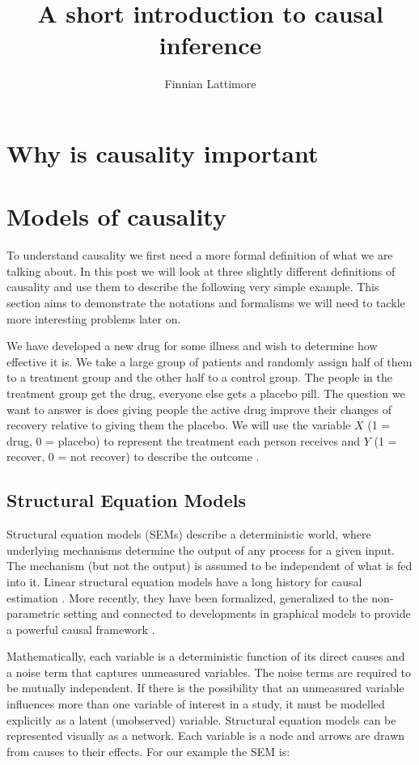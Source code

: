 \documentclass[11pt,a4paper]{article}
\author{Finnian Lattimore}
\title{A short introduction to causal inference}
\begin{document}
\def\ci{\perp\!\!\!\perp} %

\section{Why is causality important}

\section{Models of causality}
To understand causality we first need a more formal definition of what we are talking about. In this post we will look at three slightly different definitions of causality and use them to describe the following very simple example. This section aims to demonstrate the notations and formalisms we will need to tackle more interesting problems later on.

We have developed a new drug for some illness and wish to determine how effective it is. We take a large group of patients and randomly assign half of them to a treatment group and the other half to a control group. The people in the treatment group get the drug, everyone else gets a placebo pill. The question we want to answer is does giving people the active drug improve their changes of recovery relative to giving them the placebo. We will use the variable $X$ (1 = drug, 0 = placebo) to represent the treatment each person receives and $Y$ (1 = recover, 0 = not recover) to describe the outcome .
\subsection{Structural Equation Models}

Structural equation models (SEMs) describe a deterministic world, where underlying mechanisms determine the output of any process for a given input. The mechanism (but not the output) is assumed to be independent of what is fed into it. Linear structural equation models have a long history for causal estimation \cite {Wright1921,Haavelmo1943}. More recently, they have been formalized, generalized to the non-parametric setting and connected to developments in graphical models to provide a powerful causal framework \cite{Pearl2000}.

Mathematically, each variable is a deterministic function of its direct causes and a noise term that captures unmeasured variables. The noise terms are required to be mutually independent. If there is the possibility that an unmeasured variable influences more than one variable of interest in a study, it must be modelled explicitly as a latent (unobserved) variable. Structural equation models can be represented visually as a network. Each variable is a node and arrows are drawn from causes to their effects. For our example the SEM is:
\end{document}

